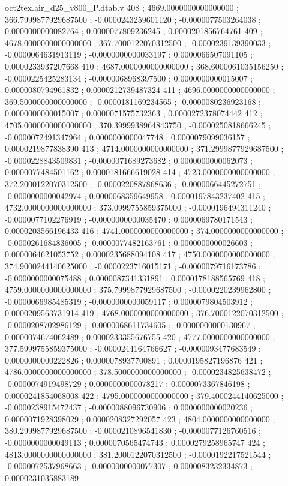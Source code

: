 \begin{filecontents}[overwrite]{oct2tex.air_d25_v800_P.dtab.v}
408 ; 4669.0000000000000000 ; 366.7999877929687500 ; -0.0000243259601120 ; -0.0000077503264038 ; 0.0000000000082764 ; 0.0000077809236245 ; 0.0000201856764761
409 ; 4678.0000000000000000 ; 367.7000122070312500 ; -0.0000239139390033 ; -0.0000064631913119 ; -0.0000000000033197 ; 0.0000066507091105 ; 0.0000233937207668
410 ; 4687.0000000000000000 ; 368.6000061035156250 ; -0.0000225425283134 ; -0.0000068968397500 ; 0.0000000000015007 ; 0.0000080794961832 ; 0.0000212739487324
411 ; 4696.0000000000000000 ; 369.5000000000000000 ; -0.0000181169234565 ; -0.0000080236923168 ; 0.0000000000015007 ; 0.0000071575732363 ; 0.0000272378074442
412 ; 4705.0000000000000000 ; 370.3999938964843750 ; -0.0000250818666245 ; -0.0000072491347964 ; 0.0000000000047748 ; 0.0000079099036157 ; 0.0000219877838390
413 ; 4714.0000000000000000 ; 371.2999877929687500 ; -0.0000228843509831 ; -0.0000071689273682 ; 0.0000000000062073 ; 0.0000077484501162 ; 0.0000181666619028
414 ; 4723.0000000000000000 ; 372.2000122070312500 ; -0.0000220887868636 ; -0.0000066445272751 ; -0.0000000000042974 ; 0.0000068359649958 ; 0.0000197843237402
415 ; 4732.0000000000000000 ; 373.0999755859375000 ; -0.0000196494311240 ; -0.0000077102276919 ; -0.0000000000035470 ; 0.0000069780171543 ; 0.0000203566196433
416 ; 4741.0000000000000000 ; 374.0000000000000000 ; -0.0000261684836005 ; -0.0000077482163761 ; 0.0000000000026603 ; 0.0000064621053752 ; 0.0000235688094108
417 ; 4750.0000000000000000 ; 374.9000244140625000 ; -0.0000223716015171 ; -0.0000079716173786 ; -0.0000000000075488 ; 0.0000087341331891 ; 0.0000178188565769
418 ; 4759.0000000000000000 ; 375.7999877929687500 ; -0.0000220239962800 ; -0.0000066985485319 ; -0.0000000000059117 ; 0.0000079804503912 ; 0.0000209563731914
419 ; 4768.0000000000000000 ; 376.7000122070312500 ; -0.0000208702986129 ; -0.0000068611734605 ; -0.0000000000130967 ; 0.0000074674062489 ; 0.0000233355676755
420 ; 4777.0000000000000000 ; 377.5999755859375000 ; -0.0000244164766627 ; -0.0000093477683549 ; 0.0000000000222826 ; 0.0000078937700891 ; 0.0000195827196876
421 ; 4786.0000000000000000 ; 378.5000000000000000 ; -0.0000234825638472 ; -0.0000074919498729 ; 0.0000000000078217 ; 0.0000073367846198 ; 0.0000241854068008
422 ; 4795.0000000000000000 ; 379.4000244140625000 ; -0.0000238915472437 ; -0.0000088096730906 ; 0.0000000000020236 ; 0.0000071928398029 ; 0.0000208327292057
423 ; 4804.0000000000000000 ; 380.2999877929687500 ; -0.0000210896541830 ; -0.0000077126760516 ; -0.0000000000049113 ; 0.0000070565474743 ; 0.0000279258965747
424 ; 4813.0000000000000000 ; 381.2000122070312500 ; -0.0000192217521544 ; -0.0000072537968663 ; -0.0000000000077307 ; 0.0000083232334873 ; 0.0000231035883189

\end{filecontents}
